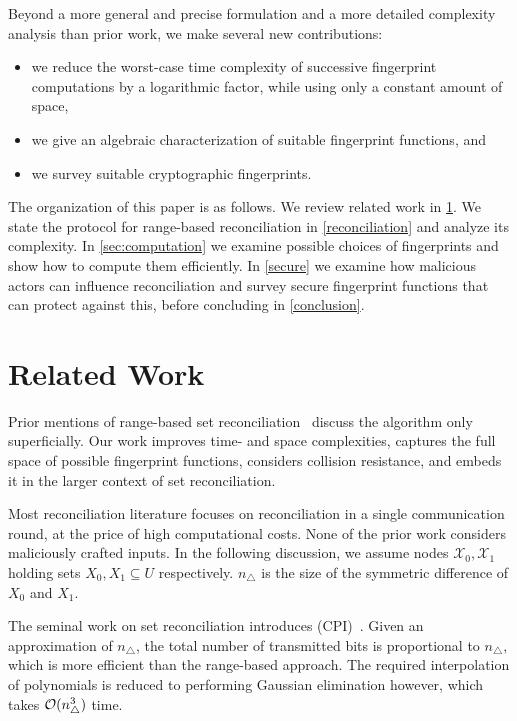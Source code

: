 \documentclass[conference]{IEEEtran}
\begin{document}
Beyond a more general and precise formulation and a more detailed complexity analysis than prior work, we make several new contributions:

\begin{itemize}
    \item we reduce the worst-case time complexity of successive fingerprint computations by a logarithmic factor, while using only a constant amount of space,
    \item we give an algebraic characterization of suitable fingerprint functions, and
    \item we survey suitable cryptographic fingerprints.
\end{itemize}

The organization of this paper is as follows. We review related work in \cref{related-work}. We state the protocol for range-based reconciliation in \cref{reconciliation} and analyze its complexity. In \cref{sec:computation} we examine possible choices of fingerprints and show how to compute them efficiently. In \cref{secure} we examine how malicious actors can influence reconciliation and survey secure fingerprint functions that can protect against this, before concluding in \cref{conclusion}.

\section{Related Work}\label{related-work}

Prior mentions of range-based set reconciliation~\cite{chen1999prototype}\cite{shang2017survey} discuss the algorithm only superficially. Our work improves time- and space complexities, captures the full space of possible fingerprint functions, considers collision resistance, and embeds it in the larger context of set reconciliation.

Most reconciliation literature focuses on reconciliation in a single communication round, at the price of high computational costs. None of the prior work considers maliciously crafted inputs. In the following discussion, we assume nodes $\mathcal{X}_0, \mathcal{X}_1$ holding sets $X_0, X_1 \subseteq U$ respectively. $n_{\triangle}$ is the size of the symmetric difference of $X_0$ and $X_1$.

The seminal work on set reconciliation introduces  (CPI)~\cite{minsky2003set}. Given an approximation of $n_{\triangle}$, the total number of transmitted bits is proportional to $n_{\triangle}$, which is more efficient than the range-based approach. The required interpolation of polynomials is reduced to performing Gaussian elimination however, which takes $\mathcal{O}(n_{\triangle}^3)$ time.
\end{document}
